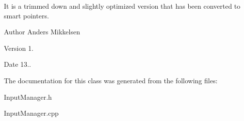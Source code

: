 It is a trimmed down and slightly optimized version that has been converted to smart pointers.

\begin{DoxyAuthor}{Author}
Anders Mikkelsen 
\end{DoxyAuthor}
\begin{DoxyVersion}{Version}
1. 
\end{DoxyVersion}
\begin{DoxyDate}{Date}
13.. 
\end{DoxyDate}


The documentation for this class was generated from the following files\+:\begin{DoxyCompactItemize}
\item 
Input\+Manager.\+h\item 
Input\+Manager.\+cpp\end{DoxyCompactItemize}
